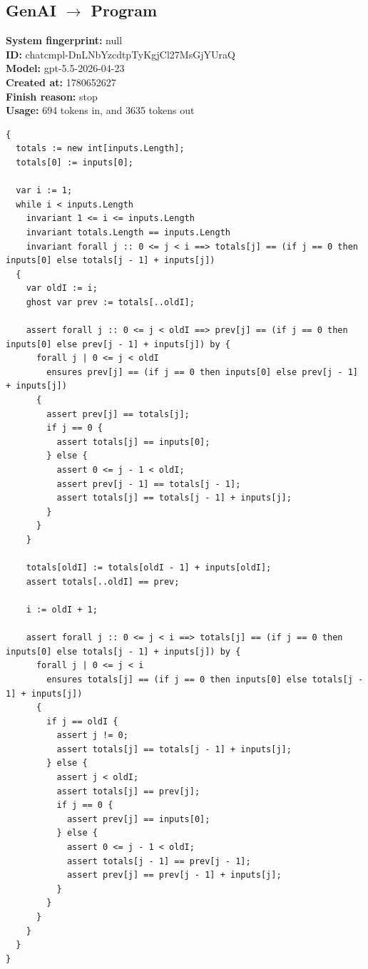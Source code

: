 \documentclass{article}
\begin{document}
\subsection*{GenAI $\rightarrow$ Program}
\textbf{System fingerprint: }null
\\\textbf{ID: }chatcmpl-DnLNbYzcdtpTyKgjCl27MsGjYUraQ
\\\textbf{Model: }gpt-5.5-2026-04-23
\\\textbf{Created at: }1780652627
\\\textbf{Finish reason: }stop
\\\textbf{Usage: }694 tokens in, and 3635 tokens out
\begin{lstlisting}
{
  totals := new int[inputs.Length];
  totals[0] := inputs[0];

  var i := 1;
  while i < inputs.Length
    invariant 1 <= i <= inputs.Length
    invariant totals.Length == inputs.Length
    invariant forall j :: 0 <= j < i ==> totals[j] == (if j == 0 then inputs[0] else totals[j - 1] + inputs[j])
  {
    var oldI := i;
    ghost var prev := totals[..oldI];

    assert forall j :: 0 <= j < oldI ==> prev[j] == (if j == 0 then inputs[0] else prev[j - 1] + inputs[j]) by {
      forall j | 0 <= j < oldI
        ensures prev[j] == (if j == 0 then inputs[0] else prev[j - 1] + inputs[j])
      {
        assert prev[j] == totals[j];
        if j == 0 {
          assert totals[j] == inputs[0];
        } else {
          assert 0 <= j - 1 < oldI;
          assert prev[j - 1] == totals[j - 1];
          assert totals[j] == totals[j - 1] + inputs[j];
        }
      }
    }

    totals[oldI] := totals[oldI - 1] + inputs[oldI];
    assert totals[..oldI] == prev;

    i := oldI + 1;

    assert forall j :: 0 <= j < i ==> totals[j] == (if j == 0 then inputs[0] else totals[j - 1] + inputs[j]) by {
      forall j | 0 <= j < i
        ensures totals[j] == (if j == 0 then inputs[0] else totals[j - 1] + inputs[j])
      {
        if j == oldI {
          assert j != 0;
          assert totals[j] == totals[j - 1] + inputs[j];
        } else {
          assert j < oldI;
          assert totals[j] == prev[j];
          if j == 0 {
            assert prev[j] == inputs[0];
          } else {
            assert 0 <= j - 1 < oldI;
            assert totals[j - 1] == prev[j - 1];
            assert prev[j] == prev[j - 1] + inputs[j];
          }
        }
      }
    }
  }
}
\end{lstlisting}
\end{document}
